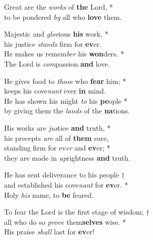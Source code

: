     Great are the \emph{works} of \textbf{the} Lord, *\\
    to be pondered \emph{by} all who \textbf{love} them.

    Majestic and \emph{glor}ious \textbf{his} work, *\\
    his justice \emph{stands} firm for \textbf{ev}er.\\
    He makes us remem\emph{ber} his \textbf{won}ders. *\\
    The Lord is \emph{com}passion \textbf{and} love.

    He gives food to \emph{those} who \textbf{fear} him; *\\
    keeps his cove\emph{nant} ever \textbf{in} mind.\\
    He has shown his might \emph{to} his \textbf{pe}ople *\\
    by giving them the \emph{lands} of the \textbf{na}tions.

    His works are \emph{jus}tice \textbf{and} truth, *\\
    his precepts \emph{are} all of \textbf{them} sure,\\
    standing firm for ev\emph{er} and \textbf{ev}er; *\\
    they are made in \emph{up}rightness \textbf{and} truth.

    He has sent deliverance to his people †\\
    and established his cove\emph{nant} for \textbf{ev}er. *\\
    Holy \emph{his} name, to \textbf{be} feared.

    To fear the Lord is the first stage of wisdom; †\\
    all who do so \emph{prove} them\textbf{selves} wise. *\\
    His praise \emph{shall} last for \textbf{ev}er!

